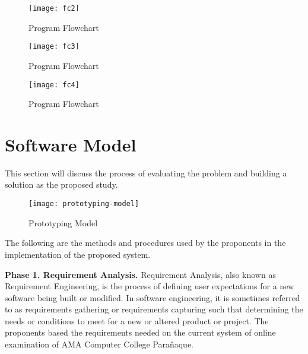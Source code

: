 \begin{figure}[h!]
   \begin{center}
      \texttt{[image: fc2]}
      \caption{Program Flowchart}
   \end{center}
\end{figure}

\pagebreak

\begin{figure}[h!]
   \begin{center}
      \texttt{[image: fc3]}
      \caption{Program Flowchart}
   \end{center}
\end{figure}

\pagebreak

\begin{figure}[h!]
   \begin{center}
      \texttt{[image: fc4]}
      \caption{Program Flowchart}
   \end{center}
\end{figure}


\section{Software Model}

This section will discuss the process of evaluating the problem and building a solution as the proposed study.

\pagebreak

\begin{figure}[h!]
   \begin{center}
      \texttt{[image: prototyping-model]}
      \caption{Prototyping Model}
   \end{center}
\end{figure}

The following are the methods and procedures used by the proponents in the implementation of the proposed system.

\textbf{Phase 1. Requirement Analysis.}
Requirement Analysis, also known as Requirement Engineering, is the process of defining user expectations for a new software being built or modified.
In software engineering, it is sometimes referred to as requirements gathering or requirements capturing such that determining the needs or conditions to meet for a new or altered product or project.
The proponents based the requirements needed on the current system of online examination of AMA Computer College Parañaque.

